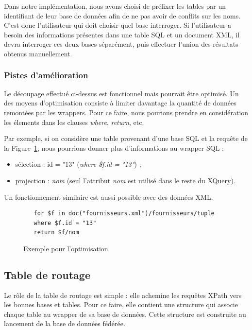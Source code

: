 \documentclass[a4paper,10pt]{article}
\newcommand{\fref}[1]{Figure~\ref{#1}}
\begin{document}
Dans notre implémentation, nous avons choisi de préfixer les tables par un identifiant de leur base de données afin de ne pas avoir de conflits sur les noms. C'est donc l'utilisateur qui doit choisir quel base interroger.
Si l'utilisateur a besoin des informations présentes dans une table SQL et un document XML, il devra interroger ces deux bases séparément, puis effectuer l'union des résultats obtenus manuellement.




\subsubsection{Pistes d'amélioration}

Le découpage effectué ci-dessus est fonctionnel mais pourrait être optimisé. Un des moyens d'optimisation consiste à limiter davantage la quantité de données remontées par les wrappers.
Pour ce faire, nous pourions prendre en considération les élements dans les clauses \emph{where}, \emph{return}, etc. 

Par exemple, si on considère une table provenant d'une base SQL et la requête de la \fref{lst:optimisation}, nous pourrions donner plus d'informations au wrapper SQL :
\begin{itemize}
\item sélection : id = "13" (\emph{where \$f.id = "13"}) ;
\item projection : \emph{nom} (seul l'attribut \emph{nom} est utilisé dans le reste du XQuery).
\end{itemize}


Un fonctionnement similaire est aussi possible avec des données XML.

\begin{figure}[ht!]
\begin{verbatim}
   for $f in doc("fournisseurs.xml")/fournisseurs/tuple
   where $f.id = "13"
   return $f/nom
\end{verbatim}
\caption{Exemple pour l'optimisation}
\label{lst:optimisation}
\end{figure}








\FloatBarrier
\subsection{Table de routage}
Le rôle de la table de routage est simple : elle achemine les requêtes XPath vers les bonnes bases et tables. Pour ce faire, elle contient une structure qui associe chaque table au wrapper de sa base de données. Cette structure est construite au lancement de la base de données fédérée.
\end{document}
